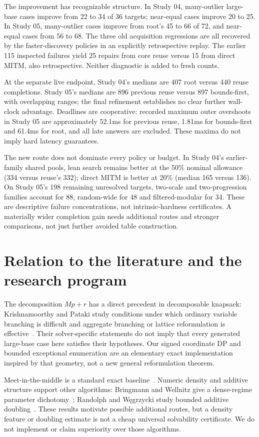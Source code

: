 \documentclass[10pt,english]{article}
\begin{document}
The improvement has recognizable structure. In Study 04, many-outlier large-base cases improve from 22 to 34 of 36 targets; near-equal cases improve 20 to 25. In Study 05, many-outlier cases improve from root's 45 to 66 of 72, and near-equal cases from 56 to 68. The three old acquisition regressions are all recovered by the faster-discovery policies in an explicitly retrospective replay. The earlier 115 inspected failures yield 25 repairs from core reuse versus 15 from direct MITM, also retrospective. Neither diagnostic is added to fresh counts.

At the separate live endpoint, Study 04's medians are 407 root versus 440 reuse completions. Study 05's medians are 896 previous reuse versus 897 bounds-first, with overlapping ranges; the final refinement establishes no clear further wall-clock advantage. Deadlines are cooperative: recorded maximum outer overshoots in Study 05 are approximately 52.1ms for previous reuse, 1.81ms for bounds-first and 61.4ms for root, and all late answers are excluded. These maxima do not imply hard latency guarantees.

The new route does not dominate every policy or budget. In Study 04's earlier-family shared pools, lean search remains better at the 50\% nominal allowance (334 versus reuse's 332); direct MITM is better at 20\% (median 165 versus 136). On Study 05's 198 remaining unresolved targets, two-scale and two-progression families account for 88, random-wide for 48 and filtered-modular for 34. These are descriptive failure concentrations, not intrinsic-hardness certificates. A materially wider completion gain needs additional routes and stronger comparisons, not just further avoided table construction.

\section{Relation to the literature and the research program}
The decomposition $Mp+r$ has a direct precedent in decomposable knapsack: Krishnamoorthy and Pataki study conditions under which ordinary variable branching is difficult and aggregate branching or lattice reformulation is effective~\cite{kp}. Their solver-specific statements do not imply that every generated large-base case here satisfies their hypotheses. Our signed coordinate DP and bounded exceptional enumeration are an elementary exact implementation inspired by that geometry, not a new general reformulation theorem.

Meet-in-the-middle is a standard exact baseline~\cite{hs}. Numeric density and additive structure support other algorithms: Bringmann and Wellnitz give a dense-regime parameter dichotomy~\cite{dense}; Randolph and W\k{e}grzycki study bounded additive doubling~\cite{doubling}. These results motivate possible additional routes, but a density feature or doubling estimate is not a cheap universal solvability certificate. We do not implement or claim superiority over those algorithms.
\end{document}
